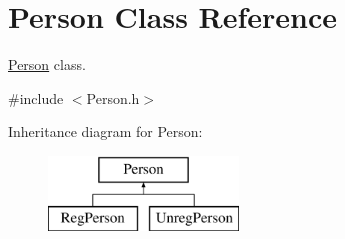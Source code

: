 \hypertarget{class_person}{\section{Person Class Reference}
\label{class_person}
}


\hyperlink{class_person}{Person} class.  




{\ttfamily \#include $<$Person.\+h$>$}

Inheritance diagram for Person\+:\begin{figure}[H]
\begin{center}
\leavevmode
\includegraphics[height=2.000000cm]{class_person}
\end{center}
\end{figure}
